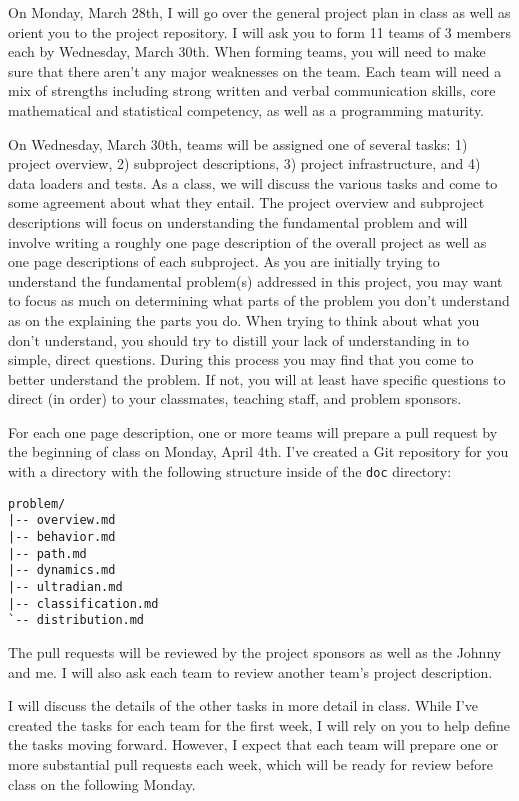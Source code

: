 \documentclass[11pt, oneside]{article}   	%
\begin{document}
On Monday, March 28th, I will go over the general project plan in class as well
as orient you to the project repository.  I will ask you to form 11 teams of 3
members each by Wednesday, March 30th.  When forming teams, you will need to
make sure that there aren't any major weaknesses on the team.  Each team will
need a mix of strengths including strong written and verbal communication
skills, core mathematical and statistical competency, as well as a programming
maturity.

On Wednesday, March 30th, teams will be assigned one of several tasks:  1)
project overview, 2) subproject descriptions, 3) project infrastructure, and 4)
data loaders and tests.  As a class, we will discuss the various tasks and come
to some agreement about what they entail.  The project overview and subproject
descriptions will focus on understanding the fundamental problem and will
involve writing a roughly one page description of the overall project as well
as one page descriptions of each subproject.  As you are initially trying to
understand the fundamental problem(s) addressed in this project, you may want
to focus as much on determining what parts of the problem you don't understand
as on the explaining the parts you do.  When trying to think about what you
don't understand, you should try to distill your lack of understanding in to
simple, direct questions.  During this process you may find that you come to
better understand the problem.  If not, you will at least have specific
questions to direct (in order) to your classmates, teaching staff, and problem
sponsors.

For each one page description, one or more teams will prepare a pull request by
the beginning of class on Monday, April 4th.  I've created a Git repository for
you with a directory with the following structure inside of the \texttt{doc}
directory:
\begin{verbatim}
problem/
|-- overview.md
|-- behavior.md
|-- path.md
|-- dynamics.md
|-- ultradian.md
|-- classification.md
`-- distribution.md
\end{verbatim}
The pull requests will be reviewed by the project sponsors as well as the
Johnny and me.  I will also ask each team to review another team's project
description.

I will discuss the details of the other tasks in more detail in class.  While
I've created the tasks for each team for the first week, I will rely on you
to help define the tasks moving forward.  However, I expect that each team
will prepare one or more substantial pull requests each week, which will be
ready for review before class on the following Monday.
\end{document}
